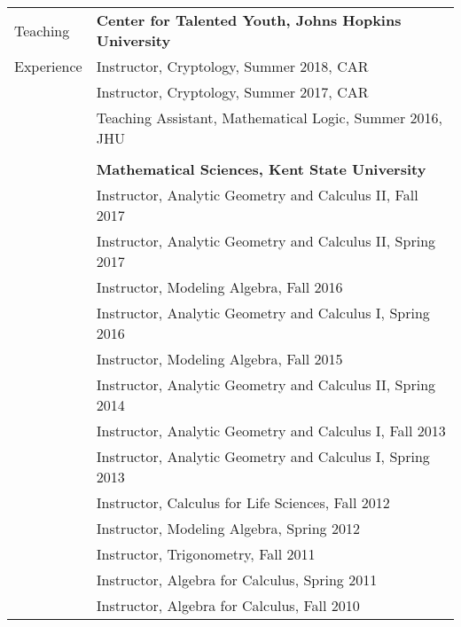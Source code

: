 \documentclass[letterpaper,10pt,oneside]{article}
\begin{document}
\vfill


\noindent \begin{tabular}{@{} l l}
 \Large{Teaching}  & \textbf{Center for Talented Youth, Johns Hopkins University} \\
 \Large{Experience} & Instructor, Cryptology, Summer 2018, CAR \\
 \hspace{1.1in} & Instructor, Cryptology, Summer 2017, CAR \\
 & Teaching Assistant, Mathematical Logic, Summer 2016, JHU \\
 & \\
 & \textbf{Mathematical Sciences, Kent State University} \\
 & Instructor, Analytic Geometry and Calculus II, Fall 2017 \\
 & Instructor, Analytic Geometry and Calculus II, Spring 2017 \\
 & Instructor, Modeling Algebra, Fall 2016 \\
 & Instructor, Analytic Geometry and Calculus I, Spring 2016 \\
 & Instructor, Modeling Algebra, Fall 2015 \\
 & Instructor, Analytic Geometry and Calculus II, Spring 2014 \\
 & Instructor, Analytic Geometry and Calculus I, Fall 2013 \\
 & Instructor, Analytic Geometry and Calculus I, Spring 2013 \\
 & Instructor, Calculus for Life Sciences, Fall 2012 \\
 & Instructor, Modeling Algebra, Spring 2012 \\
 & Instructor, Trigonometry, Fall 2011 \\
 & Instructor, Algebra for Calculus, Spring 2011 \\
 & Instructor, Algebra for Calculus, Fall 2010 \\
\end{tabular}
\end{document}

